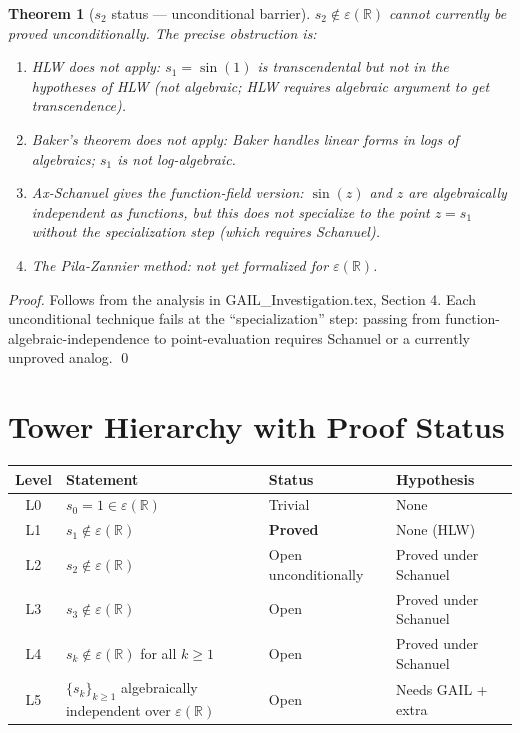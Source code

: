 \documentclass[11pt]{article}
\newtheorem{theorem}{Theorem}
\begin{document}
\begin{theorem}[$s_2$ status — unconditional barrier]
\label{thm:s2_barrier}
$s_2 \notin \varepsilon(\mathbb{R})$ cannot currently be proved unconditionally.
The precise obstruction is:
\begin{enumerate}
  \item HLW does not apply: $s_1 = \sin(1)$ is transcendental but not in the
    hypotheses of HLW (not algebraic; HLW requires algebraic argument to get transcendence).
  \item Baker's theorem does not apply: Baker handles linear forms in logs of algebraics;
    $s_1$ is not log-algebraic.
  \item Ax-Schanuel gives the function-field version: $\sin(z)$ and $z$ are algebraically
    independent as functions, but this does not specialize to the point $z = s_1$
    without the specialization step (which requires Schanuel).
  \item The Pila-Zannier method: not yet formalized for $\varepsilon(\mathbb{R})$.
\end{enumerate}
\end{theorem}

\begin{proof}
Follows from the analysis in GAIL\_Investigation.tex, Section 4.
Each unconditional technique fails at the ``specialization'' step:
passing from function-algebraic-independence to point-evaluation requires
Schanuel or a currently unproved analog. \qed
\end{proof}

\section{Tower Hierarchy with Proof Status}

\begin{center}
\renewcommand{\arraystretch}{1.3}
\begin{tabular}{clll}
\toprule
Level & Statement & Status & Hypothesis \\
\midrule
L0 & $s_0 = 1 \in \varepsilon(\mathbb{R})$ & Trivial & None \\
L1 & $s_1 \notin \varepsilon(\mathbb{R})$ & \textbf{Proved} & None (HLW) \\
L2 & $s_2 \notin \varepsilon(\mathbb{R})$ & Open unconditionally & Proved under Schanuel \\
L3 & $s_3 \notin \varepsilon(\mathbb{R})$ & Open & Proved under Schanuel \\
L4 & $s_k \notin \varepsilon(\mathbb{R})$ for all $k \geq 1$ & Open & Proved under Schanuel \\
L5 & $\{s_k\}_{k \geq 1}$ algebraically independent over $\varepsilon(\mathbb{R})$ & Open & Needs GAIL + extra \\
\bottomrule
\end{tabular}
\end{center}
\end{document}
